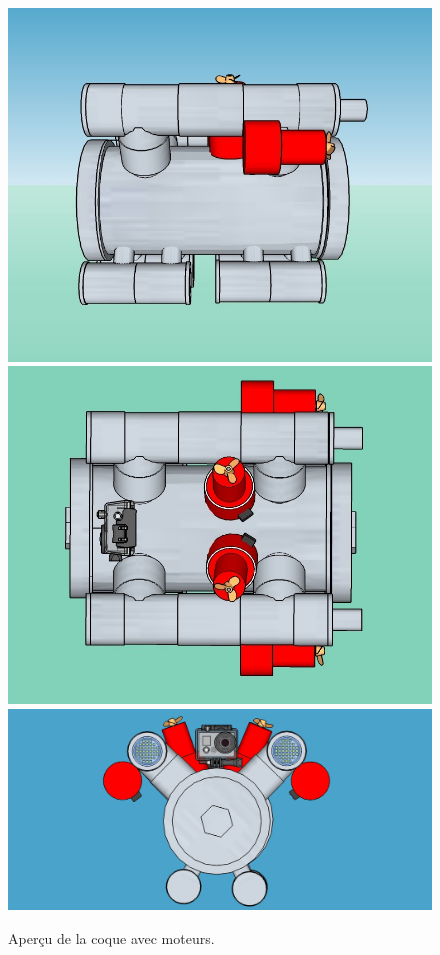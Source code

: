 \documentclass[11pt,a4paper]{article}
\begin{document}
          
        \begin{figure}[H]
          \centering
          \includegraphics[scale=0.27]{ROVGauche.jpg}
          \includegraphics[scale=0.26]{ROVHaut.jpg}
          \includegraphics[scale=0.24]{ROVFace.jpg}
          \caption{Aperçu de la coque avec moteurs.}
          \label{figApercu}
        \end{figure}
\end{document}
